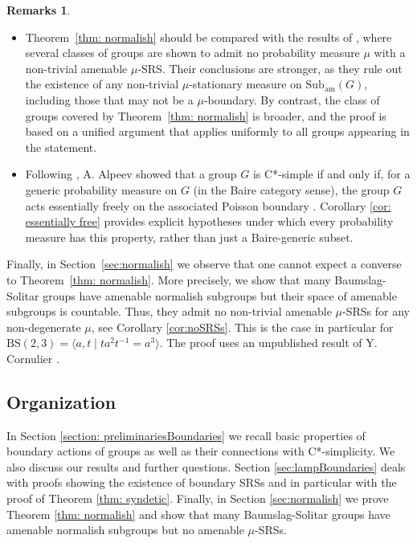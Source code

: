 \documentclass[reqno,a4paper,11pt]{amsart}
\numberwithin{equation}{section}
\newcommand{\1}{\mathbf{1}}
\theoremstyle{definition}
\newtheorem*{rmks}{Remarks}
\begin{document}
\begin{rmks}
	\ 
	\begin{itemize}
		\item Theorem~\ref{thm: normalish} should be compared with the results of \cite[Section~6]{HartmanKalantar2022}, where several classes of groups are shown to admit no probability measure $\mu$ with a non-trivial amenable $\mu$-SRS. Their conclusions are stronger, as they rule out the existence of any non-trivial $\mu$-stationary measure on $\mathrm{Sub}_\mathrm{am}(G)$, including those that may not be a $\mu$-boundary. By contrast, the class of groups covered by Theorem~\ref{thm: normalish} is broader, and the proof is based on a unified argument that applies uniformly to all groups appearing in the statement.
		\item Following \cite[Theorem 5.4]{HartmanKalantar2022}, A. Alpeev showed that a group $G$ is C*-simple if and only if, for a generic probability measure on $G$ (in the Baire category sense), the group $G$ acts essentially freely on the associated Poisson boundary \cite[Theorem B]{Alpeev2025}. Corollary \ref{cor: essentially free} provides explicit hypotheses under which every probability measure has this property, rather than just a Baire-generic subset.
	\end{itemize}
\end{rmks}

Finally, in Section~\ref{sec:normalish} we observe that one cannot expect a converse to Theorem~\ref{thm: normalish}. More precisely, we show that many Baumslag-Solitar groups have amenable normalish subgroups but their space of amenable subgroups is countable.  Thus, they admit no non-trivial amenable $\mu$-SRSs for any non-degenerate $\mu$, see Corollary \ref{cor:noSRSs}. This is the case in particular for $\mathrm{BS}(2,3)=\langle a,t \mid t a^2 t^{-1}=a^3\rangle$. The proof uses an unpublished result of Y. Cornulier \cite{CornulierMSE2021}.

\subsection{Organization}
In Section \ref{section: preliminariesBoundaries} we recall basic properties of boundary actions of groups as well as their connections with C*-simplicity. We also discuss our results and further questions. Section \ref{sec:lampBoundaries} deals with proofs showing the existence of boundary SRSs and in particular with the proof of Theorem \ref{thm: syndetic}. Finally, in Section \ref{sec:normalish} we prove Theorem \ref{thm: normalish} and show that many Baumslag-Solitar groups have amenable normalish subgroups but no amenable $\mu$-SRSs.
\end{document}
